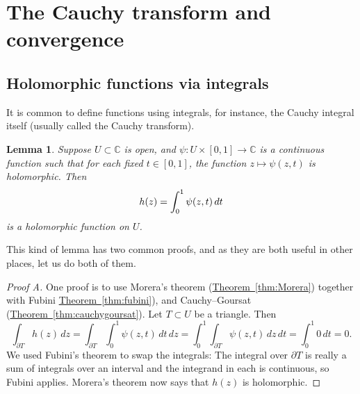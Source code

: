 \documentclass[12pt,openany]{book}
\newcommand{\avoidbreak}{\postdisplaypenalty=100}
\newcommand{\C}{{\mathbb{C}}}
\theoremstyle{plain}
\newtheorem{lemma}[thm]{Lemma}
\theoremstyle{remark}
\theoremstyle{definition}
\theoremstyle{exercise}
\theoremstyle{example}
\newcommand{\thmref}[1]{\hyperref[#1]{Theorem~\ref*{#1}}}
\begin{document}

\section{The Cauchy transform and convergence}

\subsection{Holomorphic functions via integrals}

It is common to define functions using integrals, for instance,
the Cauchy integral itself (usually called the Cauchy transform).

\begin{lemma} \label{lemma:holfuncbyintegral}
Suppose $U \subset \C$ is open, and
$\psi \colon U \times [0,1] \to \C$ is a continuous function such that
for each fixed $t \in [0,1]$, the function $z \mapsto \psi(z,t)$ is
holomorphic.  Then
\begin{equation*}
h(z) =
\int_0^1 \psi(z,t) \, dt
\avoidbreak
\end{equation*}
is a holomorphic function on $U$.
\end{lemma}

This kind of lemma has two common proofs,
and as they are both useful in other places, let us do both of them.

\begin{proof}[Proof A]
One proof is to use Morera's theorem (\thmref{thm:Morera})
together with Fubini \thmref{thm:fubini}), and Cauchy--Goursat
(\thmref{thm:cauchygoursat}).
Let $T \subset U$ be a triangle.  Then
\begin{equation*}
\int_{\partial T}
h(z)
\, dz
=
\int_{\partial T}
\int_0^1 \psi(z,t) \, dt
\, dz
=
\int_0^1
\int_{\partial T}
\psi(z,t)
\, dz
\, dt
= \int_0^1 0 \, dt = 0.
\end{equation*}
We used Fubini's theorem to swap the integrals:
The integral over $\partial T$ is really a sum of integrals over an interval
and the integrand in each is continuous, so Fubini applies.
Morera's theorem now says that $h(z)$ is
holomorphic.
\end{proof}
\end{document}
